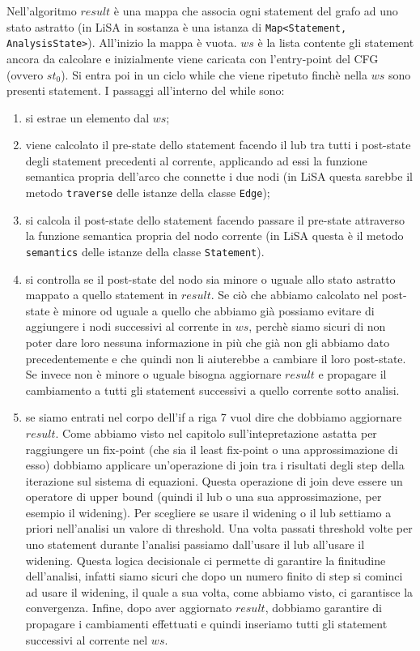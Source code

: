 Nell'algoritmo \(result\) è una mappa che associa ogni statement del grafo ad uno stato astratto (in LiSA in sostanza è una istanza di \texttt{Map<Statement, AnalysisState>}). All'inizio la mappa è vuota. \(ws\) è la lista contente gli statement ancora da calcolare e inizialmente viene caricata con l'entry-point del CFG (ovvero \(st_0\)). Si entra poi in un ciclo while che viene ripetuto finchè nella \(ws\) sono presenti statement. I passaggi all'interno del while sono:
\begin{enumerate}
\itemsep0em 
    \item si estrae un elemento dal \(ws\);
    \item viene calcolato il pre-state dello statement facendo il lub tra tutti i post-state degli statement precedenti al corrente, applicando ad essi la funzione semantica propria dell'arco che connette i due nodi (in LiSA questa sarebbe il metodo \texttt{traverse} delle istanze della classe \texttt{Edge});
    \item si calcola il post-state dello statement facendo passare il pre-state attraverso la funzione semantica propria del nodo corrente (in LiSA questa è il metodo \texttt{semantics} delle istanze della classe \texttt{Statement}).
    \item si controlla se il post-state del nodo sia minore o uguale allo stato astratto mappato a quello statement in \(result\). Se ciò che abbiamo calcolato nel post-state è minore od uguale a quello che abbiamo già possiamo evitare di aggiungere i nodi successivi al corrente in \(ws\), perchè siamo sicuri di non poter dare loro nessuna informazione in più che già non gli abbiamo dato precedentemente e che quindi non li aiuterebbe a cambiare il loro post-state. Se invece non è minore o uguale bisogna aggiornare \(result\) e propagare il cambiamento a tutti gli statement successivi a quello corrente sotto analisi. 
    \item se siamo entrati nel corpo dell'if a riga 7 vuol dire che dobbiamo aggiornare \(result\). Come abbiamo visto nel capitolo sull'intepretazione astatta per raggiungere un fix-point (che sia il least fix-point o una approssimazione di esso) dobbiamo applicare un'operazione di join tra i risultati degli step della iterazione sul sistema di equazioni. Questa operazione di join deve essere un operatore di upper bound (quindi il lub o una sua approssimazione, per esempio il widening). Per scegliere se usare il widening o il lub settiamo a priori nell'analisi un valore di threshold. Una volta passati threshold volte per uno statement durante l'analisi passiamo dall'usare il lub all'usare il widening. Questa logica decisionale ci permette di garantire la finitudine dell'analisi, infatti siamo sicuri che dopo un numero finito di step si cominci ad usare il widening, il quale a sua volta, come abbiamo visto, ci garantisce la convergenza. Infine, dopo aver aggiornato \(result\), dobbiamo garantire di propagare i cambiamenti effettuati e quindi inseriamo tutti gli statement successivi al corrente nel \(ws\). 
\end{enumerate}

